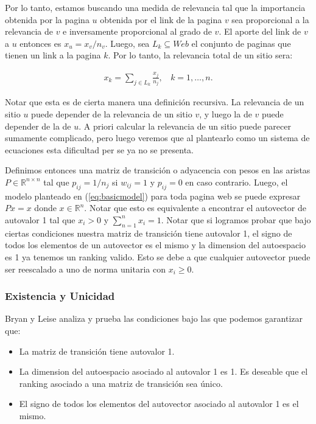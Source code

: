 Por lo tanto, estamos buscando una medida de relevancia tal que la importancia obtenida por la pagina $u$ obtenida por el link de la pagina $v$ sea proporcional a la relevancia de $v$ e inversamente proporcional al grado de $v$. El aporte del link de $v$ a $u$ entonces es $x_u = x_v / n_v$. Luego, sea $L_k \subseteq Web$ el conjunto de paginas que tienen un link a la pagina $k$. Por lo tanto, la relevancia total de un sitio sera:

\begin{eqnarray}
x_k = \sum_{j \in L_k} \frac{x_j}{n_j},~~~~k = 1,\dots,n. \label{eq:basicmodel}
\end{eqnarray}

Notar que esta es de cierta manera una definición recursiva. La relevancia de un sitio $u$ puede depender de la relevancia de un sitio $v$, y luego la de $v$ puede depender de la de $u$. A priori calcular la relevancia de un sitio puede parecer sumamente complicado, pero luego veremos que al plantearlo como un sistema de ecuaciones esta dificultad per se ya no se presenta.

Definimos entonces una matriz de transición o adyacencia con pesos en las aristas $P \in \mathbb{R}^{n \times n}$ tal que $p_{ij} = 1 / n_j$ si $w_{ij} = 1$ y $p_{ij} = 0$ en caso contrario. Luego, el modelo planteado en (\ref{eq:basicmodel}) para toda pagina web se puede expresar $Px = x$ donde $x \in \mathbb{R}^n$. Notar que esto es equivalente a encontrar el autovector de autovalor 1 tal que $x_i > 0$ y $\sum_{n=1}^{n} x_i = 1$. Notar que si logramos probar que bajo ciertas condiciones nuestra matriz de transición tiene autovalor 1, el signo de todos los elementos de un autovector es el mismo y la dimension del autoespacio es 1 ya tenemos un ranking valido. Esto se debe a que cualquier autovector puede ser reescalado a uno de norma unitaria con $x_i \geq 0$.

\pagebreak

\subsubsection{Existencia y Unicidad}

Bryan y Leise \cite{Bryan2006} analiza y prueba las condiciones bajo las que podemos garantizar que:
\begin{itemize}
\item La matriz de transición tiene autovalor 1.
\item La dimension del autoespacio asociado al autovalor 1 es 1. Es deseable que el ranking asociado a una matriz de transición sea único.
\item El signo de todos los elementos del autovector asociado al autovalor 1 es el mismo.
\end{itemize}

